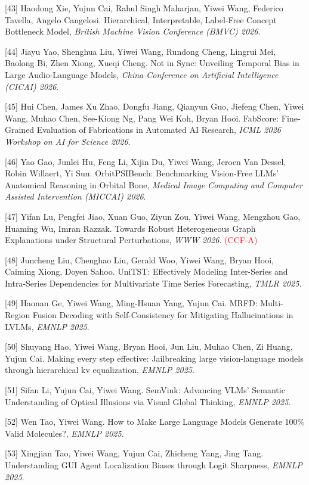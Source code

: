 [43] Haodong Xie, Yujun Cai, Rahul Singh Maharjan, Yiwei Wang, Federico Tavella, Angelo Cangelosi. Hierarchical, Interpretable, Label-Free Concept Bottleneck Model, \textit{British Machine Vision Conference (BMVC) 2026}.

[44] Jiayu Yao, Shenghua Liu, Yiwei Wang, Rundong Cheng, Lingrui Mei, Baolong Bi, Zhen Xiong, Xueqi Cheng. Not in Sync: Unveiling Temporal Bias in Large Audio-Language Models, \textit{China Conference on Artificial Intelligence (CICAI) 2026}.

[45] Hui Chen, James Xu Zhao, Dongfu Jiang, Qianyun Guo, Jiefeng Chen, Yiwei Wang, Muhao Chen, See-Kiong Ng, Pang Wei Koh, Bryan Hooi. FabScore: Fine-Grained Evaluation of Fabrications in Automated AI Research, \textit{ICML 2026 Workshop on AI for Science 2026}.

[46] Yao Gao, Junlei Hu, Feng Li, Xijin Du, Yiwei Wang, Jeroen Van Dessel, Robin Willaert, Yi Sun. OrbitPSIBench: Benchmarking Vision-Free LLMs’ Anatomical Reasoning in Orbital Bone, \textit{Medical Image Computing and Computer Assisted Intervention (MICCAI) 2026}.

[47] Yifan Lu, Pengfei Jiao, Xuan Guo, Ziyun Zou, Yiwei Wang, Mengzhou Gao, Huaming Wu, Imran Razzak. Towards Robust Heterogeneous Graph Explanations under Structural Perturbations, \textit{WWW 2026}. \textcolor{red}{(CCF-A)}

[48] Juncheng Liu, Chenghao Liu, Gerald Woo, Yiwei Wang, Bryan Hooi, Caiming Xiong, Doyen Sahoo. UniTST: Effectively Modeling Inter-Series and Intra-Series Dependencies for Multivariate Time Series Forecasting, \textit{TMLR 2025}.

[49] Haonan Ge, Yiwei Wang, Ming-Hsuan Yang, Yujun Cai. MRFD: Multi-Region Fusion Decoding with Self-Consistency for Mitigating Hallucinations in LVLMs, \textit{EMNLP 2025}.

[50] Shuyang Hao, Yiwei Wang, Bryan Hooi, Jun Liu, Muhao Chen, Zi Huang, Yujun Cai. Making every step effective: Jailbreaking large vision-language models through hierarchical kv equalization, \textit{EMNLP 2025}.

[51] Sifan Li, Yujun Cai, Yiwei Wang. SemVink: Advancing VLMs' Semantic Understanding of Optical Illusions via Visual Global Thinking, \textit{EMNLP 2025}.

[52] Wen Tao, Yiwei Wang. How to Make Large Language Models Generate 100\% Valid Molecules?, \textit{EMNLP 2025}.

[53] Xingjian Tao, Yiwei Wang, Yujun Cai, Zhicheng Yang, Jing Tang. Understanding GUI Agent Localization Biases through Logit Sharpness, \textit{EMNLP 2025}.

